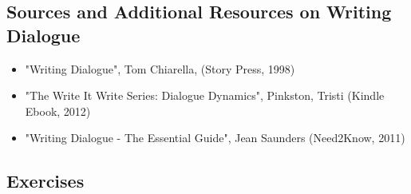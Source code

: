 \documentclass[11pt]{article}
\begin{document}
\subsection*{Sources and Additional Resources on Writing Dialogue}
\begin{itemize}
\item "Writing Dialogue", Tom Chiarella, (Story Press, 1998)
\item "The Write It Write Series: Dialogue Dynamics",  Pinkston, Tristi  (Kindle Ebook, 2012)
\item "Writing Dialogue - The Essential Guide", Jean Saunders  (Need2Know, 2011)
\end{itemize}

\subsection*{Exercises}
\end{document}
